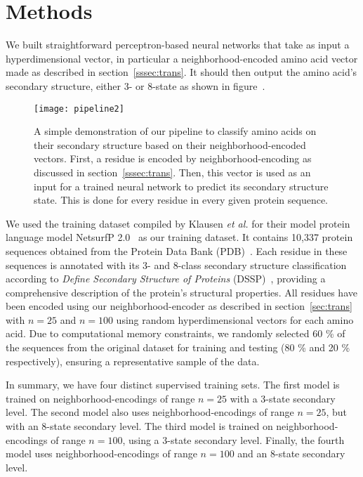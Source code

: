 \section{Methods}
We built straightforward perceptron-based neural networks that take as input a hyperdimensional vector, in particular a neighborhood-encoded amino acid vector made as described in section~\ref{sssec:trans}. It should then output the amino acid's secondary structure, either 3- or 8-state as shown in figure~\cite{fig:pipe2}.

\begin{figure}[H]
    \centering
    \texttt{[image: pipeline2]}
    \caption{A simple demonstration of our pipeline to classify amino acids on their secondary structure based on their neighborhood-encoded vectors. First, a residue is encoded by neighborhood-encoding as discussed in section~\ref{sssec:trans}. Then, this vector is used as an input for a trained neural network to predict its secondary structure state. This is done for every residue in every given protein sequence.}\label{fig:pipe2}
\end{figure}

We used the training dataset compiled by Klausen \textit{et al.} for their model protein language model NetsurfP 2.0~\cite{netsurf} as our training dataset. It contains 10,337 protein sequences obtained from the Protein Data Bank (PDB)~\cite{pdb}. Each residue in these sequences is annotated with its 3- and 8-class secondary structure classification according to \textit{Define Secondary Structure of Proteins} (DSSP)~\cite{dssp}, providing a comprehensive description of the protein's structural properties. All residues have been encoded using our neighborhood-encoder as described in section~\ref{sec:trans} with $n=25$ and $n=100$ using random hyperdimensional vectors for each amino acid. Due to computational memory constraints, we randomly selected 60 \% of the sequences from the original dataset for training and testing (80 \% and 20 \% respectively), ensuring a representative sample of the data.

In summary, we have four distinct supervised training sets. The first model is trained on neighborhood-encodings of range $n=25$ with a 3-state secondary level. The second model also uses neighborhood-encodings of range $n=25$, but with an 8-state secondary level. The third model is trained on neighborhood-encodings of range $n=100$, using a 3-state secondary level. Finally, the fourth model uses neighborhood-encodings of range $n=100$ and an 8-state secondary level.

